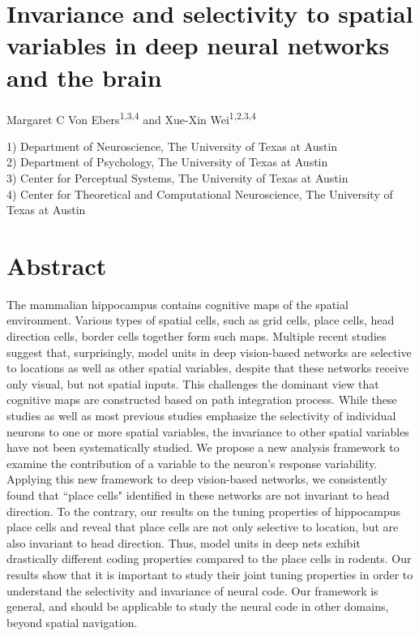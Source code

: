 \documentclass[11pt]{article}
\begin{document}

\section*{\LARGE  Invariance and selectivity to spatial variables in deep neural networks and the brain }


Margaret C Von Ebers\textsuperscript{1,3,4} and Xue-Xin Wei\textsuperscript{1,2,3,4}


1) Department of Neuroscience, The University of Texas at Austin\\
2) Department of Psychology, The University of Texas at Austin\\
3) Center for Perceptual Systems, The University of Texas at Austin\\
4) Center for Theoretical and Computational Neuroscience, The University of Texas at Austin

\section*{Abstract}
The mammalian hippocampus contains cognitive maps of the spatial environment. Various types of spatial cells, such as grid cells, place cells, head direction cells, border cells together form such maps.  Multiple recent studies suggest that, surprisingly, model units in deep vision-based networks are selective to locations as well as other spatial variables, despite that these networks receive only visual, but not spatial inputs. This challenges the dominant view that cognitive maps are constructed based on path integration process.  While these studies as well as most previous studies emphasize the selectivity of individual neurons to one or more spatial variables, the invariance to other spatial variables have not been systematically studied. We propose a new analysis framework to examine the contribution of a variable to the neuron's response variability. Applying this new framework to deep vision-based networks, we consistently found that ``place cells" identified in these networks are not invariant to head direction. 
To the contrary, our results on the tuning properties of hippocampus place cells and reveal that place cells are not only selective to location, but are also invariant to head direction. Thus, model units in deep nets exhibit drastically different coding properties compared to the place cells in rodents. 
Our results show that it is important to study their joint tuning properties in order to understand the selectivity and invariance of neural code. Our framework is general, and should be applicable to study the neural code in other domains, beyond spatial navigation. 
\end{document}
